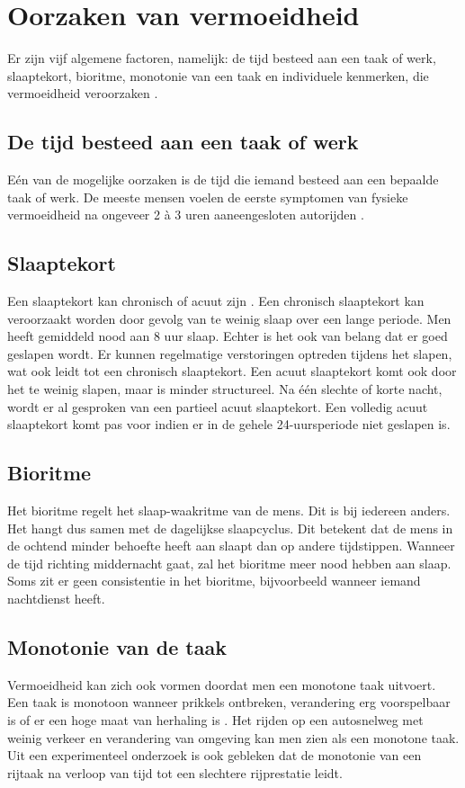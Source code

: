 \section{Oorzaken van vermoeidheid}
Er zijn vijf algemene factoren, namelijk: de tijd besteed aan een taak of werk, slaaptekort, bioritme, monotonie van een taak en individuele kenmerken, die vermoeidheid veroorzaken \autocite{Brown}.
\subsection{De tijd besteed aan een taak of werk}
Eén van de mogelijke oorzaken is de tijd die iemand besteed aan een bepaalde taak of werk. De meeste mensen voelen de eerste symptomen van fysieke vermoeidheid na ongeveer 2 à 3 uren aaneengesloten autorijden \autocite{RiguelleGoldenbeld}.
\subsection{Slaaptekort}
Een slaaptekort kan chronisch of acuut zijn \autocite{VanSchagen2003}. Een chronisch slaaptekort kan veroorzaakt worden door gevolg van te weinig slaap over een lange periode. Men heeft gemiddeld nood aan 8 uur slaap. Echter is het ook van belang dat er goed geslapen wordt. Er kunnen regelmatige verstoringen optreden tijdens het slapen, wat ook leidt tot een chronisch slaaptekort. Een acuut slaaptekort komt ook door het te weinig slapen, maar is minder structureel. Na één slechte of korte nacht, wordt er al gesproken van een partieel acuut slaaptekort. Een volledig acuut slaaptekort komt pas voor indien er in de gehele 24-uursperiode niet geslapen is.
\subsection{Bioritme}
Het bioritme regelt het slaap-waakritme van de mens. Dit is bij iedereen anders. Het hangt dus samen met de dagelijkse slaapcyclus. Dit betekent dat de mens in de ochtend minder behoefte heeft aan slaapt dan op andere tijdstippen. Wanneer de tijd richting middernacht gaat, zal het bioritme meer nood hebben aan slaap. Soms zit er geen consistentie in het bioritme, bijvoorbeeld wanneer iemand nachtdienst heeft.
\subsection{Monotonie van de taak}
Vermoeidheid kan zich ook vormen doordat men een monotone taak uitvoert. Een taak is monotoon wanneer prikkels ontbreken, verandering erg voorspelbaar is of er een hoge maat van herhaling is \autocite{DaCoTA}. Het rijden op een autosnelweg met weinig verkeer en verandering van omgeving kan men zien als een monotone taak. Uit een experimenteel onderzoek is ook gebleken dat de monotonie van een rijtaak na verloop van tijd tot een slechtere rijprestatie leidt.
